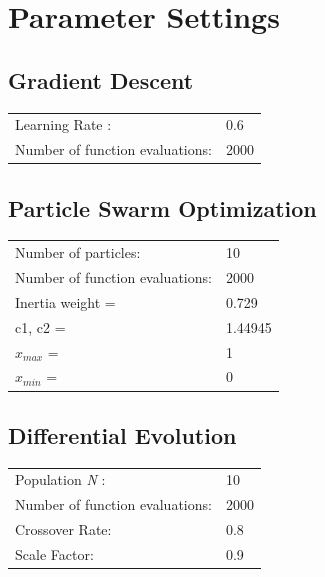 \documentclass[11pt, a4paper]{report}
\begin{document}
\section{Parameter Settings}
\subsection{Gradient Descent}
\begin{tabular}{l l}
	Learning Rate \alpha: & 0.6 \\
	Number of function evaluations: & 2000 \\ 
\end{tabular}

\subsection{Particle Swarm Optimization}
\begin{tabular}{l l}
	Number of particles: & 10 \\
	Number of function evaluations: & 2000 \\ 
	Inertia weight = & 0.729 \\
	c1, c2 = & 1.44945 \\
	$ x_{max} $ = & 1 \\
	$ x_{min} $ = & 0 \\
\end{tabular}

\subsection{Differential Evolution}
\begin{tabular}{l l}
	Population \textit{N} : & 10\\
	Number of function evaluations: & 2000 \\ 
	Crossover Rate: & 0.8 \\
	Scale Factor: & 0.9 \\
\end{tabular}
\end{document}
